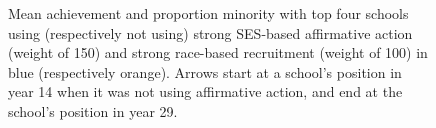 \begin{figure}[p]
  \centering
  \caption{Mean achievement and proportion minority with top four schools using (respectively not using) strong SES-based affirmative action (weight of 150) and strong race-based recruitment (weight of 100) in \colorbox{sns-blue}{blue} (respectively \colorbox{sns-orange}{orange}). 
  Arrows start at a school's position in year 14 when it was not using affirmative action, and end at the school's position in year 29.}
  \label{fig:3a}
\end{figure}

